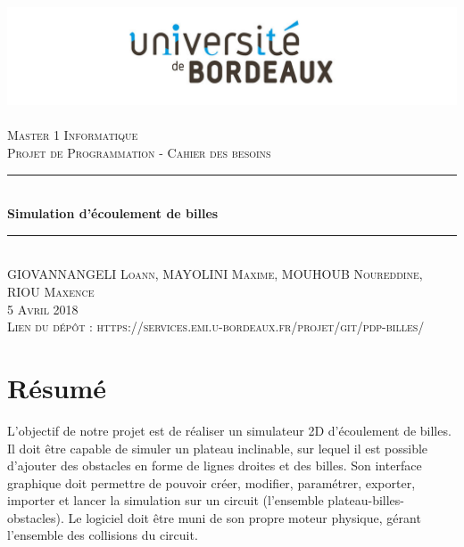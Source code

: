 \documentclass{report}
\newcommand{\HRule}{\rule{\linewidth}{0.5mm}}
\begin{document}
%
	\begin{titlepage}
	\begin{center}
		\includegraphics[scale=0.30]{universite-Bordeaux.jpg}~\\[1.5cm]
		\textsc{\LARGE Master 1 Informatique}\\[2cm]
		
		\textsc{\Large Projet de Programmation - Cahier des besoins}\\[1.5cm]
		
		\HRule \\[0.4cm]
		{  \huge{\bfseries Simulation d'écoulement de billes}\\[0.4cm] }
		\HRule \\[2cm]
		
		\textsc{GIOVANNANGELI Loann, MAYOLINI Maxime, MOUHOUB Noureddine, RIOU Maxence}\\[0.4cm]
		
    	\textsc{\large 5 Avril 2018} \\
        \vspace{2cm}
        \textsc{Lien du dépôt : https://services.emi.u-bordeaux.fr/projet/git/pdp-billes/}
	\end{center}
	\end{titlepage}
    
    
\section*{Résumé}

L'objectif de notre projet est de réaliser un simulateur 2D d'écoulement de billes. Il doit être capable de simuler un plateau inclinable, sur lequel il est possible d’ajouter des obstacles en forme de lignes droites et des billes. Son interface graphique doit permettre de pouvoir créer, modifier, paramétrer, exporter, importer et lancer la simulation sur un circuit (l’ensemble plateau-billes-obstacles). Le logiciel doit être muni de son propre moteur physique, gérant l’ensemble des collisions du circuit. \\
\end{document}
